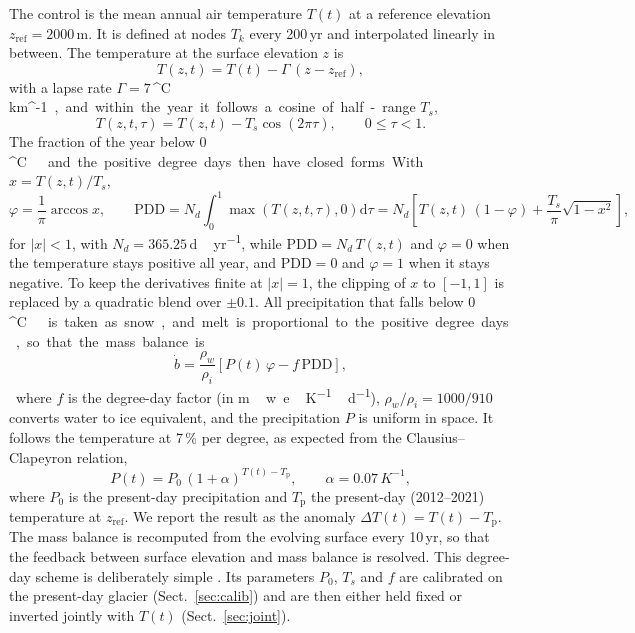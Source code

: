 \documentclass[tc, manuscript]{copernicus}
\newcommand{\degC}{\unit{^{\circ}C}}
\begin{document}
The control is the mean annual air temperature $T(t)$ at a reference elevation $z_\mathrm{ref}=2000$\,m. It is defined at nodes $T_k$ every 200\,yr and interpolated linearly in between. The temperature at the surface elevation $z$ is
\begin{equation}
T(z,t) = T(t) - \Gamma\,(z-z_\mathrm{ref}),
\label{eq:lapse}
\end{equation}
with a lapse rate $\Gamma=7$\,\unit{^{\circ}C\,km^{-1}}, and within the year it follows a cosine of half-range $T_s$,
\begin{equation}
T(z,t,\tau) = T(z,t) - T_s\cos(2\pi\tau),\qquad 0\le\tau<1.
\label{eq:season}
\end{equation}
The fraction of the year below 0\,\degC\ and the positive degree days then have closed forms. With $x=T(z,t)/T_s$,
\begin{equation}
\varphi = \frac{1}{\pi}\arccos x,\qquad
\mathrm{PDD} = N_d\int_0^1 \max\!\left(T(z,t,\tau),0\right)\mathrm{d}\tau = N_d\left[T(z,t)\,(1-\varphi)+\frac{T_s}{\pi}\sqrt{1-x^2}\right],
\label{eq:pdd}
\end{equation}
for $|x|<1$, with $N_d=365.25$\,\unit{d\,yr^{-1}}, while $\mathrm{PDD}=N_d\,T(z,t)$ and $\varphi=0$ when the temperature stays positive all year, and $\mathrm{PDD}=0$ and $\varphi=1$ when it stays negative. To keep the derivatives finite at $|x|=1$, the clipping of $x$ to $[-1,1]$ is replaced by a quadratic blend over $\pm0.1$. All precipitation that falls below 0\,\degC\ is taken as snow, and melt is proportional to the positive degree days, so that the mass balance is
\begin{equation}
\dot b = \frac{\rho_w}{\rho_i}\left[P(t)\,\varphi - f\,\mathrm{PDD}\right],
\label{eq:smb}
\end{equation}
where $f$ is the degree-day factor (in \unit{m\,w.e.\,K^{-1}\,d^{-1}}), $\rho_w/\rho_i=1000/910$ converts water to ice equivalent, and the precipitation $P$ is uniform in space. It follows the temperature at 7\,\% per degree, as expected from the Clausius--Clapeyron relation,
\begin{equation}
P(t) = P_0\,(1+\alpha)^{T(t)-T_\mathrm{p}},\qquad \alpha=0.07\,\unit{K^{-1}},
\label{eq:cc}
\end{equation}
where $P_0$ is the present-day precipitation and $T_\mathrm{p}$ the present-day (2012--2021) temperature at $z_\mathrm{ref}$. We report the result as the anomaly $\Delta T(t)=T(t)-T_\mathrm{p}$. The mass balance is recomputed from the evolving surface every 10\,yr, so that the feedback between surface elevation and mass balance is resolved. This degree-day scheme is deliberately simple \citep{hock2003}. Its parameters $P_0$, $T_s$ and $f$ are calibrated on the present-day glacier (Sect.~\ref{sec:calib}) and are then either held fixed or inverted jointly with $T(t)$ (Sect.~\ref{sec:joint}).
\end{document}
